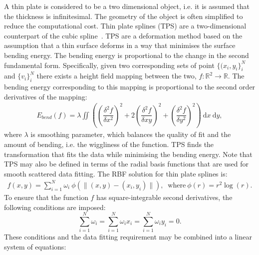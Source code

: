 \documentclass[11pt]{report}
\newcommand{\dd}{\: \mathrm{d}}
\begin{document}
A thin plate is considered to be a two dimensional object, i.e. it is assumed that the thickness is infinitesimal. The geometry of the object is often simplified to reduce the computational cost. Thin plate splines (TPS) are a two-dimensional counterpart of the cubic spline~\cite{Sibson:1991}. TPS are a deformation method based on the assumption that a thin surface deforms in a way that minimises the surface bending energy. The bending energy is proportional to the change in the second fundamental form. Specifically, given two corresponding sets of point $\{(x_i, y_i\}_i^N$ and $\{v_i\}_i^N$ there exists a height field mapping between the two, $f: \mathbb{R}^2 \to \mathbb{R}$. The bending energy corresponding to this mapping is proportional to the second order derivatives of the mapping:
\begin{equation}
\begin{aligned}
	E_{bend}(f) = \lambda \iint \left( \left( \dfrac{\delta^2f}{\delta x^2} \right)^2 +  2 \left( \dfrac{\delta^2f}{\delta x y} \right)^2 +  \left( \dfrac{\delta^2f}{\delta y^2} \right)^2 \right) \dd x \dd y,
\end{aligned}
\end{equation} where $\lambda$ is smoothing parameter, which balances the quality of fit and the amount of bending, i.e. the wiggliness of the function. TPS finds the transformation that fits the data while minimising the bending energy. Note that TPS may also be defined in terms of the radial basis functions that are used for smooth scattered data fitting. The RBF solution for thin plate splines is:
\begin{equation}
\begin{aligned}
	f(x,y) = \sum_{i=1}^N \omega_i \: \phi(\|(x,y) - (x_i,y_i)\|), \: \text{ where} \: \phi(r) = r^2 \log(r).
\end{aligned}
\end{equation} To ensure that the function $f$ has square-integrable second derivatives, the following conditions are imposed:
\begin{equation}
	\sum_{i=1}^N \omega_i = \sum_{i=1}^N \omega_i x_i = \sum_{i=1}^N \omega_i y_i = 0.\label{eq:TPSrestrictions}
\end{equation} These conditions and the data fitting requirement may be combined into a linear system of equations:
\end{document}
